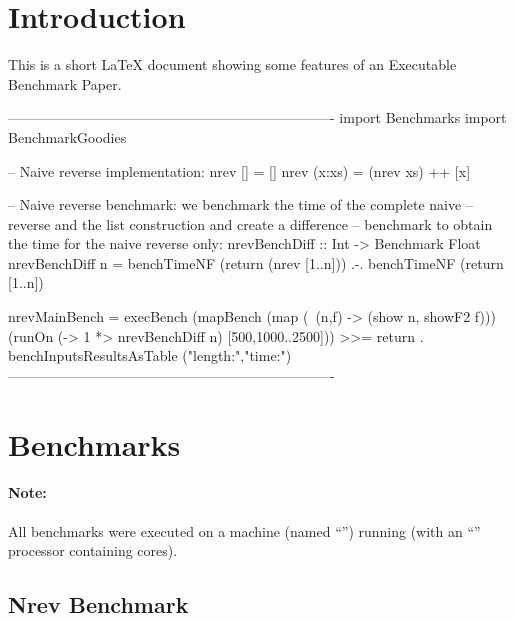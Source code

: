 \documentclass{article}
\begin{document}
\sloppy

\section{Introduction}

This is a short LaTeX document showing some features of an
Executable Benchmark Paper.

\begin{curryprog}
----------------------------------------------------------------------
import Benchmarks
import BenchmarkGoodies

-- Naive reverse implementation:
nrev []     = []
nrev (x:xs) = (nrev xs) ++ [x]

-- Naive reverse benchmark: we benchmark the time of the complete naive
-- reverse and the list construction and create a difference
-- benchmark to obtain the time for the naive reverse only:
nrevBenchDiff :: Int -> Benchmark Float
nrevBenchDiff n =
  benchTimeNF (return (nrev [1..n]))  .-.  benchTimeNF (return [1..n])

nrevMainBench =
  execBench (mapBench (map (\ (n,f) -> (show n, showF2 f)))
               (runOn (\n -> 1 *> nrevBenchDiff n) [500,1000..2500])) >>=
    return . benchInputsResultsAsTable ("length:","time:")
----------------------------------------------------------------------
\end{curryprog}

\section{Benchmarks}

\paragraph{Note:}
%
All benchmarks were executed on a  machine
(named ``'')
running  
(with an ``'' processor containing
 cores).

\subsection{Nrev Benchmark}

\begin{center}
\end{center}
\end{document}
